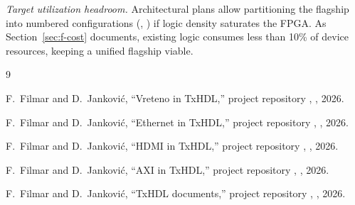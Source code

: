 \documentclass[journal,9pt]{IEEEtran}
\begin{document}
\emph{Target utilization headroom.} Architectural plans allow partitioning the
flagship into numbered configurations (, ) if
logic density saturates the FPGA. As Section~\ref{sec:f-cost} documents, existing
logic consumes less than 10\% of device resources, keeping a unified flagship
viable.

\begin{thebibliography}{9}

F.~Filmar and D.~Janković, ``Vreteno in TxHDL,'' project repository
, , 2026.

F.~Filmar and D.~Janković, ``Ethernet in TxHDL,'' project repository
, , 2026.

F.~Filmar and D.~Janković, ``HDMI in TxHDL,'' project repository
, , 2026.

F.~Filmar and D.~Janković, ``AXI in TxHDL,'' project repository
, , 2026.

F.~Filmar and D.~Janković, ``TxHDL documents,'' project repository
, , 2026.

\end{thebibliography}
\end{document}
